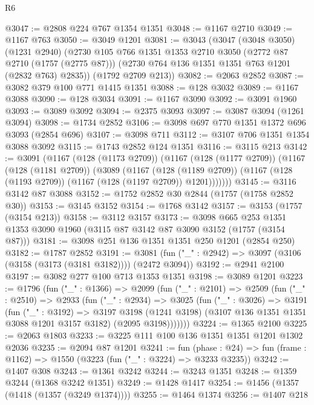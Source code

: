 \begin{lexlean}{R6}
\begin{coremodule}
@3047 := @2808 @224 @767 @1354 @1351
@3048 := @1167 @2710
@3049 := @1167 @763
@3050 := @3049 @1201
@3081 := @3043
    (@3047
      (@3048 @3050)
      (@1231 @2940)
      (@2730
        @105
        @766
        @1351
        @1353
        @2710
        @3050
        (@2772 @87 @2710 (@1757 (@2775 @87)))
        (@2730 @764 @136 @1351 @1351 @763 @1201 (@2832 @763) @2835))
      (@1792 @2709 @213))
@3082 := @2063 @2852
@3087 := @3082 @379 @100 @771 @1415 @1351
@3088 := @128 @3032
@3089 := @1167 @3088
@3090 := @128 @3034
@3091 := @1167 @3090
@3092 := @3091 @1960
@3093 := @3089 @3092
@3094 := @2375 @3093
@3097 := @3087 @3094 (@1261 @3094)
@3098 := @1734 @2852
@3106 := @3098 @697 @770 @1351 @1372 @696 @3093 (@2854 @696)
@3107 := @3098 @711
@3112 := @3107 @706 @1351 @1354 @3088 @3092
@3115 := @1743 @2852 @124 @1351
@3116 := @3115 @213
@3142 := @3091
    (@1167
      (@128 (@1173 @2709))
      (@1167
        (@128 (@1177 @2709))
        (@1167
          (@128 (@1181 @2709))
          (@3089
            (@1167
              (@128 (@1189 @2709))
              (@1167 (@128 (@1193 @2709)) (@1167 (@128 (@1197 @2709)) @1201)))))))
@3145 := @3116 @3142 @87 @3088
@3152 := @1752 @2852 @30 @2844 (@1757 (@1758 @2852 @30))
@3153 := @3145 @3152
@3154 := @1768 @3142
@3157 := @3153 (@1757 (@3154 @213))
@3158 := @3112 @3157
@3173 := @3098
    @665
    @253
    @1351
    @1353
    @3090
    @1960
    (@3115 @87 @3142 @87 @3090 @3152 (@1757 (@3154 @87)))
@3181 := @3098 @251 @136 @1351 @1351 @250 @1201 (@2854 @250)
@3182 := @1787 @2852
@3191 := @3081 (fun ("_" : @2942) => @3097 (@3106 (@3158 (@3173 (@3181 @3182)))) (@2472 @3094))
@3192 := @2941 @2100
@3197 := @3082 @277 @100 @713 @1353 @1351
@3198 := @3089 @1201
@3223 := @1796
    (fun ("_" : @1366) =>
    @2099
      (fun ("_" : @2101) =>
      @2509
        (fun ("_" : @2510) =>
        @2933
          (fun ("_" : @2934) =>
          @3025
            (fun ("_" : @3026) =>
            @3191
              (fun ("_" : @3192) =>
              @3197
                @3198
                (@1241 @3198)
                (@3107 @136 @1351 @1351 @3088 @1201 @3157 @3182)
                (@2095 @3198)))))))
@3224 := @1365 @2100
@3225 := @2063 @1803
@3233 := @3225 @111 @100 @136 @1351 @1351 @1201 @1302 @2036
@3235 := @2094 @87 @1201
@3241 := fun (phase : @24) =>
  fun (frame : @1162) => @1550 (@3223 (fun ("_" : @3224) => @3233 @3235))
@3242 := @1407 @308
@3243 := @1361 @3242
@3244 := @3243 @1351
@3248 := @1359 @3244 (@1368 @3242 @1351)
@3249 := @1428 @1417
@3254 := @1456 (@1357 (@1418 (@1357 (@3249 @1374))))
@3255 := @1464 @1374
@3256 := @1407 @218

\end{coremodule}
\end{lexlean}
